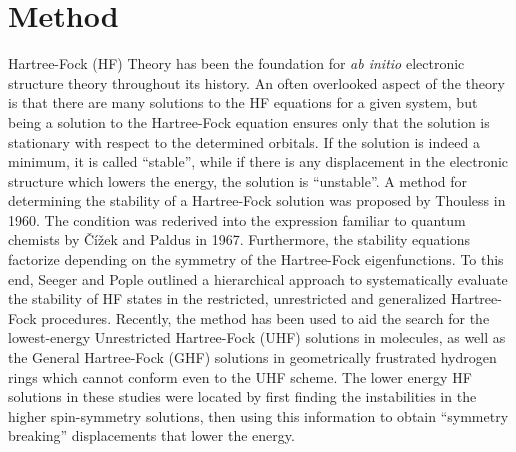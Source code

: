 \documentclass[preprint, journal=prl]{revtex4-1}
\begin{document}
    
\section{Method}
  Hartree-Fock (HF) Theory has been the foundation for \emph{ab initio} electronic structure theory  throughout its history. An often overlooked aspect of the theory is that there are many solutions to the HF equations for a given system, but being a solution to the Hartree-Fock equation ensures only that the solution is stationary with respect to the determined orbitals. If the solution is indeed a minimum, it is called ``stable'', while if there is any displacement in the electronic structure which lowers the energy, the solution is ``unstable''. A method for determining the stability of a Hartree-Fock solution was proposed by Thouless in 1960\cite{Thouless1960}. The condition was rederived into the expression familiar to quantum chemists by Čížek and Paldus in 1967\cite{Cizek1967}. Furthermore, the stability equations factorize depending on the symmetry of the Hartree-Fock eigenfunctions. To this end, Seeger and Pople outlined a hierarchical approach to systematically evaluate the stability of HF states in the restricted, unrestricted and generalized Hartree-Fock procedures\cite{Seeger1977}. Recently, the method has been used to aid the search for the lowest-energy Unrestricted Hartree-Fock (UHF) solutions in molecules, as well as the General Hartree-Fock (GHF) solutions in geometrically frustrated hydrogen rings which cannot conform even to the UHF scheme\cite{Pulay2016, Goings2015}. The lower energy HF solutions in these studies were located by first finding the instabilities in the higher spin-symmetry solutions, then using this information to obtain ``symmetry breaking'' displacements that lower the energy.    
  
\end{document}
